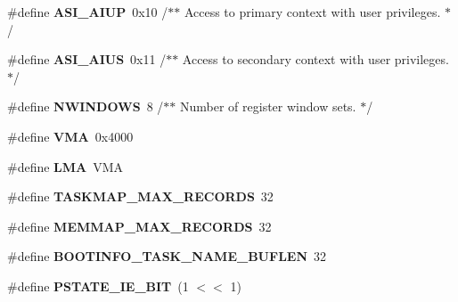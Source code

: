 \begin{DoxyCompactItemize}
\item 
\mbox{\label{group__RTEMSBSPsSPARC64_ga2f5aa599f1992f45a346f8f45c3682f2}} 
\#define {\bfseries A\+S\+I\+\_\+\+A\+I\+UP}~0x10	/$\ast$$\ast$ Access to primary context with user privileges. $\ast$/
\item 
\mbox{\label{group__RTEMSBSPsSPARC64_gaa098c23c39c7f6e92e20a8847b9b402f}} 
\#define {\bfseries A\+S\+I\+\_\+\+A\+I\+US}~0x11	/$\ast$$\ast$ Access to secondary context with user privileges. $\ast$/
\item 
\mbox{\label{group__RTEMSBSPsSPARC64_ga0fdd86cf63edac5468316f531294601f}} 
\#define {\bfseries N\+W\+I\+N\+D\+O\+WS}~8	/$\ast$$\ast$ Number of register window sets. $\ast$/
\item 
\mbox{\label{group__RTEMSBSPsSPARC64_ga5283c6883f5bc007f49ad0499977f55c}} 
\#define {\bfseries V\+MA}~0x4000
\item 
\mbox{\label{group__RTEMSBSPsSPARC64_ga7cd22708c0b1a90869760d209a39a87a}} 
\#define {\bfseries L\+MA}~V\+MA
\item 
\mbox{\label{group__RTEMSBSPsSPARC64_ga01809a0d509c59d0b158d9759d8e8a52}} 
\#define {\bfseries T\+A\+S\+K\+M\+A\+P\+\_\+\+M\+A\+X\+\_\+\+R\+E\+C\+O\+R\+DS}~32
\item 
\mbox{\label{group__RTEMSBSPsSPARC64_gad6a2d3cf70e492add190d27ead196ee7}} 
\#define {\bfseries M\+E\+M\+M\+A\+P\+\_\+\+M\+A\+X\+\_\+\+R\+E\+C\+O\+R\+DS}~32
\item 
\mbox{\label{group__RTEMSBSPsSPARC64_gaab9b2129b5807b90de8b5b803f131244}} 
\#define {\bfseries B\+O\+O\+T\+I\+N\+F\+O\+\_\+\+T\+A\+S\+K\+\_\+\+N\+A\+M\+E\+\_\+\+B\+U\+F\+L\+EN}~32
\item 
\mbox{\label{group__RTEMSBSPsSPARC64_ga4ac093914d6ebcd369e591a8b34b19a9}} 
\#define {\bfseries P\+S\+T\+A\+T\+E\+\_\+\+I\+E\+\_\+\+B\+IT}~(1 $<$$<$ 1)
\item 

\end{DoxyCompactItemize}
